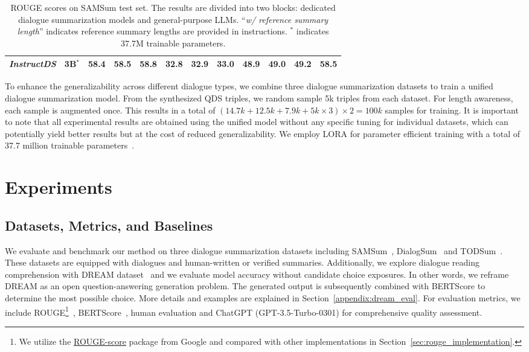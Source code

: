\documentclass[11pt]{article}
\begin{document}
\begin{table*}[t]
\begin{adjustbox}{width=1.00\textwidth,center}
\begin{tabular}{| l c | c  c  c | c  c  c | c  c  c | c | }
        \emph{InstructDS} & 3B$^*$ & \textbf{58.4} & 58.5 & 58.8 & \textbf{32.8} & 32.9 & 33.0 & \textbf{48.9} & 49.0 & 49.2 & \textbf{58.5} \\
        \bottomrule
        \end{tabular}
        \end{adjustbox}
        \caption{ROUGE scores on SAMSum test set. The results are divided into two blocks: dedicated dialogue summarization models and general-purpose LLMs. ``\emph{w/ reference summary length}'' indicates reference summary lengths are provided in instructions. $^*$ indicates 37.7M trainable parameters.}
        \label{tab:samsum_results}
    \end{table*}


        To enhance the generalizability across different dialogue types, we combine three dialogue summarization datasets to train a unified dialogue summarization model. From the synthesized QDS triples, we random sample 5k triples from each dataset. For length awareness, each sample is augmented once. This results in a total of $(14.7k+12.5k+7.9k+5k\times3)\times2=100k$ samples for training. It is important to note that all experimental results are obtained using the unified model without any specific tuning for individual datasets, which can potentially yield better results but at the cost of reduced generalizability. We employ LORA for parameter efficient training with a total of 37.7 million trainable parameters~\cite{hu2022lora}.


\section{Experiments}

    \subsection{Datasets, Metrics, and Baselines}

        We evaluate and benchmark our method on three dialogue summarization datasets including SAMSum~\cite{gliwa-etal-2019-samsum}, DialogSum~\cite{chen-etal-2021-dialogsum} and TODSum~\cite{zhao2021todsum}. These datasets are equipped with dialogues and human-written or verified summaries. Additionally, we explore dialogue reading comprehension with DREAM dataset~\cite{sun-etal-2019-dream} and we evaluate model accuracy without candidate choice exposures. In other words, we reframe DREAM as an open question-answering generation problem. The generated output is subsequently combined with BERTScore to determine the most possible choice. More details and examples are explained in Section~\ref{appendix:dream_eval}. For evaluation metrics, we include ROUGE\footnote{We utilize the \href{https://pypi.org/project/rouge-score/0.1.2/}{ROUGE-score} package from Google and compared with other implementations in Section~\ref{sec:rouge_implementation}.}~\cite{lin-2004-rouge}, BERTScore~\cite{bert-score}, human evaluation and ChatGPT (GPT-3.5-Turbo-0301) for comprehensive quality assessment.
\end{document}
